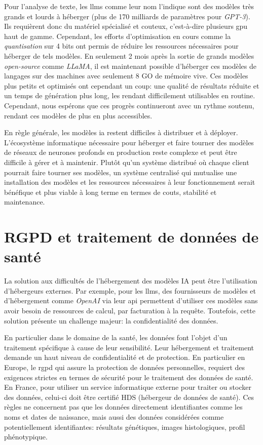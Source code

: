 Pour l'analyse de texte, les \gls{llms} comme leur nom l'indique sont des modèles très grands et lourds à héberger (plus de 170 milliards de paramètres pour \textit{GPT-3}). Ils requièrent donc du matériel spécialisé et couteux, c'est-à-dire plusieurs \gls{gpu} haut de gamme. Cependant, les efforts d'optimisation en cours comme la \textit{quantisation} sur 4 bits ont permis de réduire les ressources nécessaires pour héberger de tels modèles. En seulement 2 mois après la sortie de grands modèles \textit{open-source} comme \textit{LLaMA}, il est maintenant possible d'héberger ces modèles de langages sur des machines avec seulement 8 GO de mémoire vive. Ces modèles plus petits et optimisés ont cependant un coup: une qualité de résultats réduite et un temps de génération plus long, les rendant difficilement utilisables en routine. Cependant, nous espérons que ces progrès continueront avec un rythme soutenu, rendant ces modèles de plus en plus accessibles.

En règle générale, les modèles \gls{ia} restent difficiles à distribuer et à déployer. L'écosystème informatique nécessaire pour héberger et faire tourner des modèles de réseaux de neurones profonds en production reste complexe et peut être difficile à gérer et à maintenir. Plutôt qu'un système distribué où chaque client pourrait faire tourner ses modèles, un système centralisé qui mutualise une installation des modèles et les ressources nécessaires à leur fonctionnement serait bénéfique et plus viable à long terme en termes de couts, stabilité et maintenance.

\section{RGPD et traitement de données de santé}
La solution aux difficultés de l'hébergement des modèles IA peut être l'utilisation d'hébergeurs externes. Par exemple, pour les \gls{llms}, des fournisseurs de modèles et d'hébergement comme \textit{OpenAI} via leur \gls{api} permettent d'utiliser ces modèles sans avoir besoin de ressources de calcul, par facturation à la requête. Toutefois, cette solution présente un challenge majeur: la confidentialité des données.

En particulier dans le domaine de la santé, les données font l'objet d'un traitement spécifique à cause de leur sensibilité. Leur hébergement et traitement demande un haut niveau de confidentialité et de protection. En particulier en Europe, le \gls{rgpd} qui assure la protection de données personnelles, requiert des exigences strictes en termes de sécurité pour le traitement des données de santé. En France, pour utiliser un service informatique externe pour traiter ou stocker des données, celui-ci doit être certifié HDS (hébergeur de données de santé). Ces règles ne concernent pas que les données directement identifiantes comme les noms et dates de naissance, mais aussi des données considérées comme potentiellement identifiantes: résultats génétiques, images histologiques, profil phénotypique. 

